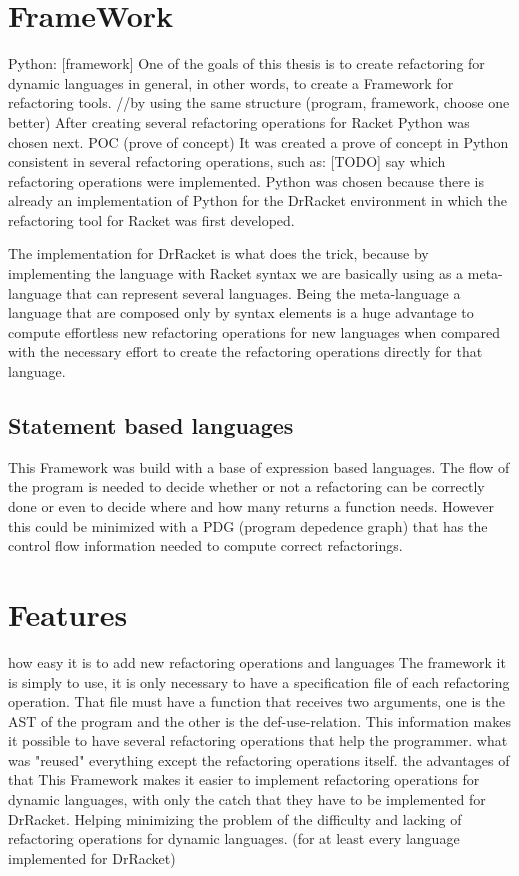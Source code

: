 \section{FrameWork}
Python: [framework]
One of the goals of this thesis is to create refactoring for dynamic languages in general,
in other words, to create a Framework for refactoring tools.
//by using the same structure (program, framework, choose one better)
After creating several refactoring operations for Racket Python was chosen next.
POC (prove of concept)
It was created a prove of concept in Python consistent in several refactoring operations, such as:
[TODO] say which refactoring operations were implemented.
Python was chosen because there is already an implementation of Python for the
 DrRacket environment in which the refactoring tool for Racket was first developed.


 The implementation for DrRacket is what does the trick, because by implementing
 the language with Racket syntax we are basically using as a meta-language that
 can represent several languages. Being the meta-language a language that are
 composed only by syntax elements is a huge advantage to compute effortless new
 refactoring operations for new languages when compared with the necessary effort to create
 the refactoring operations directly for that language.

\subsection{Statement based languages}
This Framework was build with a base of expression based languages. The flow of
the program is needed to decide whether or not a refactoring can be correctly done
or even to decide where and how many returns a function needs. However this could
be minimized with a PDG (program depedence graph) that has the control flow information
needed to compute correct refactorings.

\section{Features}
how easy it is to add new refactoring operations and languages
The framework it is simply to use, it is only necessary to have a specification file
of each refactoring operation.
That file must have a function that receives two arguments,
one is the AST of the program and the other is the def-use-relation.
This information makes it possible to have several refactoring operations that help
the programmer.
what was "reused"
everything except the refactoring operations itself.
the advantages of that
This Framework makes it easier to implement refactoring operations for dynamic languages,
with only the catch that they have to be implemented for DrRacket. Helping minimizing
the problem of the difficulty and lacking of refactoring operations for dynamic languages.
(for at least every language implemented for DrRacket)


